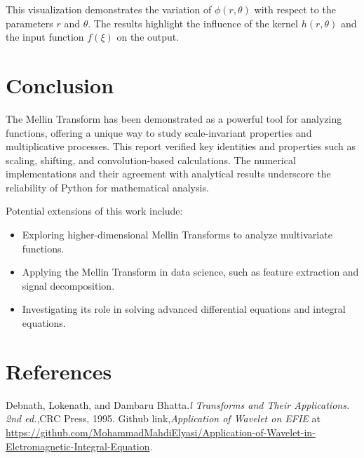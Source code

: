 \documentclass[a4paper, 12pt]{article}
\begin{document}
This visualization demonstrates the variation of $\phi(r, \theta)$ with respect to the parameters $r$ and $\theta$. The results highlight the influence of the kernel $h(r, \theta)$ and the input function $f(\xi)$ on the output.

\section{Conclusion}
The Mellin Transform has been demonstrated as a powerful tool for analyzing functions, offering a unique way to study scale-invariant properties and multiplicative processes. This report verified key identities and properties such as scaling, shifting, and convolution-based calculations. The numerical implementations and their agreement with analytical results underscore the reliability of Python for mathematical analysis.

Potential extensions of this work include:
\begin{itemize}
    \item Exploring higher-dimensional Mellin Transforms to analyze multivariate functions.
    \item Applying the Mellin Transform in data science, such as feature extraction and signal decomposition.
    \item Investigating its role in solving advanced differential equations and integral equations.
\end{itemize}

\newpage

\clearpage

\section{References}

\begin{thebibliography}{99}
     Debnath, Lokenath, and Dambaru Bhatta.\textit{l Transforms and Their Applications. 2nd ed.},CRC Press, 1995.
     Github link,\textit{Application of Wavelet on EFIE} at \url{https://github.com/MohammadMahdiElyasi/Application-of-Wavelet-in-Elctromagnetic-Integral-Equation}.

\end{thebibliography}
\end{document}
